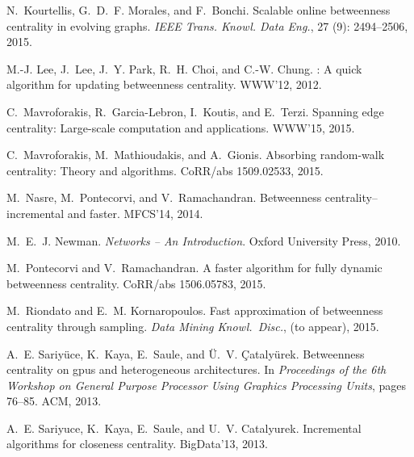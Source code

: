 \documentclass[11pt]{article}
\begin{document}
\begin{thebibliography}{22}
N.~Kourtellis, G.~D.~F. Morales, and F.~Bonchi.
\newblock Scalable online betweenness centrality in evolving graphs.
\newblock \emph{{IEEE} Trans. Knowl. Data Eng.}, 27 (9):
  2494--2506, 2015.

M.-J. Lee, J.~Lee, J.~Y. Park, R.~H. Choi, and C.-W. Chung.
: A quick algorithm for updating betweenness centrality.
\newblock WWW'12, 2012.

C.~Mavroforakis, R.~Garcia-Lebron, I.~Koutis, and E.~Terzi.
\newblock Spanning edge centrality: Large-scale computation and applications.
\newblock WWW'15, 2015.

C.~Mavroforakis, M.~Mathioudakis, and A.~Gionis.
\newblock Absorbing random-walk centrality: Theory and algorithms.
\newblock CoRR/abs 1509.02533,  2015.

M.~Nasre, M.~Pontecorvi, and V.~Ramachandran.
\newblock Betweenness centrality--incremental and faster.
\newblock MFCS'14, 2014.

M.~E.~J. Newman.
\newblock \emph{Networks -- An Introduction}.
\newblock Oxford University Press, 2010.

M.~Pontecorvi and V.~Ramachandran.
\newblock A faster algorithm for fully dynamic betweenness centrality.
\newblock CoRR/abs 1506.05783, 2015.

M.~Riondato and E.~M. Kornaropoulos.
\newblock Fast approximation of betweenness centrality through sampling.
\newblock \emph{Data Mining Knowl.~Disc.}, (to appear), 2015.

A.~E. Sariy{\"u}ce, K.~Kaya, E.~Saule, and {\"U}.~V. {\c{C}}ataly{\"u}rek.
\newblock Betweenness centrality on gpus and heterogeneous architectures.
\newblock In \emph{Proceedings of the 6th Workshop on General Purpose Processor
  Using Graphics Processing Units}, pages 76--85. ACM, 2013.

A.~E. Sariyuce, K.~Kaya, E.~Saule, and U.~V. Catalyurek.
\newblock Incremental algorithms for closeness centrality.
\newblock BigData'13, 2013.


\end{thebibliography}
\end{document}
